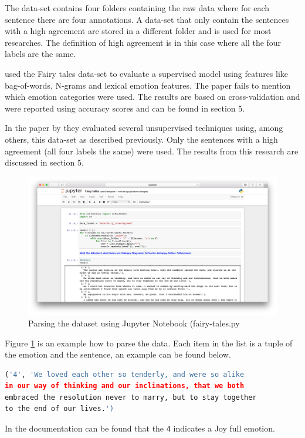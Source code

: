 \documentclass[11pt]{article}
\begin{document}
The data-set contains four folders containing the raw data where for each sentence there are four annotations. A data-set that only contain the sentences with a high agreement are stored in a different folder and is used for most researches. The definition of high agreement is in this case where all the four labels are the same.

 
 used the Fairy tales data-set to evaluate a supervised model using features like bag-of-words, N-grams and lexical emotion features. The paper fails to mention which emotion categories were used. The results are based on cross-validation and were reported using accuracy scores and can be found in section 5.

In the paper by \cite{kim2010evaluation} they evaluated several unsupervised techniques using, among others, this data-set as described previously. Only the sentences with a high agreement (all four labels the same) were used. The results from this research are discussed in section 5. 

\begin{figure}[htb]
  \includegraphics[width=\linewidth]{dataset_fairy-tales.png}
  \caption{Parsing the dataset using Jupyter Notebook (fairy-tales.py}
  \label{fig:dataset_fairy-tales}
\end{figure}

Figure \ref{fig:dataset_fairy-tales} is an example how to parse the data. Each item in the list is a tuple of the emotion and the sentence, an example can be found below.
\begin{lstlisting}[language=python, caption=Fairy tales example]
('4', 'We loved each other so tenderly, and were so alike 
in our way of thinking and our inclinations, that we both 
embraced the resolution never to marry, but to stay together 
to the end of our lives.')
\end{lstlisting}
In the documentation can be found that the \texttt{4} indicates a Joy full emotion.
\end{document}
